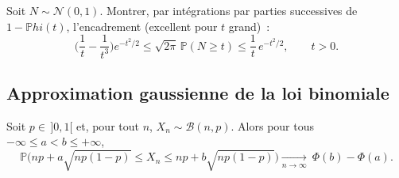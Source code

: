 \begin{exercice}
\label{ex:queue-gauss}
Soit $N\sim\mathcal N(0,1)$. Montrer, par intégrations par parties successives
de $1-\mathbb{P}hi(t)$, l'encadrement (excellent pour $t$ grand)~:
\[
  \Big(\frac1t-\frac1{t^3}\Big)e^{-t^2/2}\le \sqrt{2\pi}\,\mathbb{P}(N\ge t)
  \le \frac1t\,e^{-t^2/2},\qquad t>0.
\]
\end{exercice}

\newpage












































































\subsection{Approximation gaussienne de la loi binomiale}

\medskip

\begin{mdframed}
\begin{theoreme}
\label{th:moivre-laplace}
Soit $p\in\,]0,1[$ et, pour tout $n$, $X_n\sim\mathcal{B}(n,p)$. Alors pour
tous $-\infty\le a<b\le+\infty$,
\[
  \mathbb{P}\!\Big(np+a\sqrt{np(1-p)}\le X_n\le np+b\sqrt{np(1-p)}\Big)
  \xrightarrow[n\to\infty]{}\ \Phi(b)-\Phi(a).
\]
\end{theoreme}
\end{mdframed}

